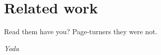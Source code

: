 




\part{Related work}
\label{p:related}
\epigraph{Read them have you? Page-turners they were not.}{\textit{Yoda}}

